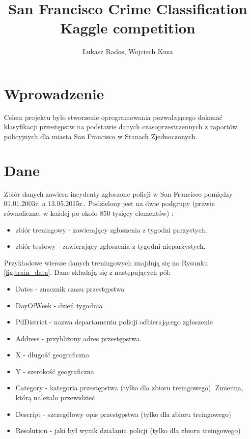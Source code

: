 \documentclass[11pt]{article} %
\title{San Francisco Crime Classification\\ \large{Kaggle competition  }}
\author{Łukasz Rados, Wojciech Kusa}
\affil{Wydział Fizyki i Informatyki Stosowanej \\ Akademia Górniczo-Hutnicza w Krakowie}
\begin{document}
\maketitle

\section{Wprowadzenie}

Celem projektu było stworzenie oprogramowania pozwalającego dokonać klasyfikacji przestępstw na podstawie danych czasoprzestrzennych z raportów policyjnych dla miasta San Francisco w Stanach Zjednoczonych. 


\section{Dane}

Zbiór danych zawiera incydenty zgłoszone policji w San Francisco pomiędzy 01.01.2003r. a 13.05.2015r.. Podzielony jest na dwie podgrupy (prawie równoliczne, w każdej po około 850 tysięcy elementów) :
\begin{itemize}
\item zbiór treningowy - zawierający zgłoszenia z tygodni parzystych,

\item zbiór testowy -  zawierający zgłoszenia z tygodni nieparzystych.
\end{itemize} 

Przykładowe wiersze danych treningowych znajdują się na Rysunku \ref{fig:train_data}. Dane składają się z następujących pól:

\begin{itemize}
\item Dates - znacznik czasu przestępstwa
\item DayOfWeek - dzień tygodnia
\item PdDistrict - nazwa departamentu policji odbierającego zgłoszenie
\item Address - przybliżony adres przestępstwa
\item X - długość geograficzna
\item Y - szerokość geograficzna
\item Category - kategoria przestępstwa (tylko dla zbioru treingowego). Zmienna, którą należało przewidzieć
\item Descript - szczegółowy opis przestępstwa (tylko dla zbioru treingowego)
\item Resolution - jaki był wynik działania policji (tylko dla zbioru treingowego)

\end{itemize}
\end{document}

